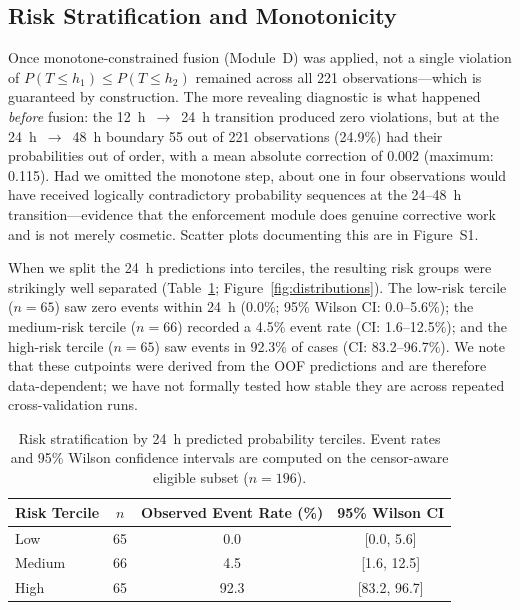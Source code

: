 \documentclass[fire,article,submit,pdftex]{../Definitions/mdpi}
\begin{document}
\subsection{Risk Stratification and Monotonicity}\label{sec:stratification}

Once monotone-constrained fusion (Module~D) was applied, not a single violation of $P(T \leq h_1) \leq P(T \leq h_2)$ remained across all 221 observations---which is guaranteed by construction.
The more revealing diagnostic is what happened \emph{before} fusion: the 12~h~$\to$~24~h transition produced zero violations, but at the 24~h~$\to$~48~h boundary 55 out of 221 observations (24.9\%) had their probabilities out of order, with a mean absolute correction of 0.002 (maximum: 0.115).
Had we omitted the monotone step, about one in four observations would have received logically contradictory probability sequences at the 24--48~h transition---evidence that the enforcement module does genuine corrective work and is not merely cosmetic.
Scatter plots documenting this are in Figure~S1.

When we split the 24~h predictions into terciles, the resulting risk groups were strikingly well separated (Table~\ref{tab:stratification}; Figure~\ref{fig:distributions}).
The low-risk tercile ($n = 65$) saw zero events within 24~h (0.0\%; 95\% Wilson CI: 0.0--5.6\%); the medium-risk tercile ($n = 66$) recorded a 4.5\% event rate (CI: 1.6--12.5\%); and the high-risk tercile ($n = 65$) saw events in 92.3\% of cases (CI: 83.2--96.7\%).
We note that these cutpoints were derived from the OOF predictions and are therefore data-dependent; we have not formally tested how stable they are across repeated cross-validation runs.

\begin{table}[!ht]
\caption{Risk stratification by 24~h predicted probability terciles. Event rates and 95\% Wilson confidence intervals are computed on the censor-aware eligible subset ($n = 196$).}\label{tab:stratification}
\begin{tabular}{lccc}
\toprule
\textbf{Risk Tercile} & \textbf{$n$} & \textbf{Observed Event Rate (\%)} & \textbf{95\% Wilson CI} \\
\midrule
Low    & 65 & 0.0  & [0.0, 5.6] \\
Medium & 66 & 4.5  & [1.6, 12.5] \\
High   & 65 & 92.3 & [83.2, 96.7] \\
\bottomrule
\end{tabular}
\end{table}
\end{document}
